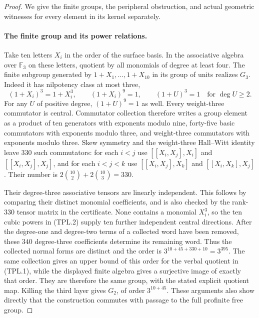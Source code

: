 \begin{proof}
We give the finite groups, the peripheral obstruction, and actual
geometric witnesses for every element in its kernel separately.

\paragraph{The finite group and its power relations.}
Take ten letters $X_i$ in the order of the surface basis.
In the associative algebra over
$\mathbb F_3$ on these letters, quotient by all monomials of
degree at least four.  The finite subgroup generated by
$1+X_1,\ldots,1+X_{10}$ in its group of units realizes $G_3$.
Indeed it has nilpotency class at most three,
\[
 (1+X_i)^3=1+X_i^3,\qquad (1+X_i)^9=1,
 \qquad (1+U)^3=1\quad\text{for }\deg U\geq2.
                                                        \tag{TPL.2}
\]
For any $U$ of positive degree, $(1+U)^9=1$ as well.
Every weight-three commutator is central.  Commutator collection
therefore writes a group element as a product of ten generators
with exponents modulo nine, forty-five basic commutators with
exponents modulo three, and weight-three commutators with
exponents modulo three.  Skew symmetry and the weight-three
Hall--Witt identity leave $330$ such commutators: for each
$i<j$ use $[[X_i,X_j],X_i]$ and $[[X_i,X_j],X_j]$, and
for each $i<j<k$ use $[[X_i,X_j],X_k]$ and
$[[X_i,X_k],X_j]$.  Their number is
$2\binom{10}{2}+2\binom{10}{3}=330$.

Their degree-three associative tensors are linearly independent.
This follows by comparing their distinct monomial coefficients,
and is also checked by the rank-$330$ tensor matrix in the
certificate.  None contains a monomial $X_i^3$, so the ten
cubic powers in (TPL.2) supply ten further independent central
directions.  After the degree-one and degree-two terms of a
collected word have been removed, these $340$ degree-three
coefficients determine its remaining word.  Thus the collected
normal forms are distinct and the order is
$3^{10+45+330+10}=3^{395}$.
The same collection gives an upper bound of this order for the
verbal quotient in (TPL.1), while the displayed finite algebra
gives a surjective image of exactly that order.  They are
therefore the same group, with the stated explicit quotient map.
Killing the third layer gives $G_2$, of order $3^{10+45}$.
These arguments also show directly that the construction
commutes with passage to the full profinite free group.


\end{proof}
